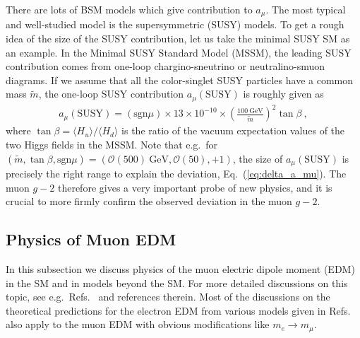 There are lots of BSM models which give contribution
to $a_\mu$.  
The most typical and well-studied model is the
supersymmetric (SUSY) models.  
To get a rough idea of the size of the SUSY contribution,
let us take the minimal SUSY SM as an example. 
In the Minimal SUSY Standard Model (MSSM), the
leading SUSY contribution comes from
one-loop chargino-sneutrino or neutralino-smuon diagrams.  
If we assume that all the color-singlet SUSY particles have a common
mass $\tilde{m}$, the one-loop SUSY contribution
$a_\mu(\text{SUSY})$ is roughly given as~\cite{Czarnecki:2001pv}
%
\begin{align}
 a_\mu(\text{SUSY}) = (\text{sgn} \mu)  \times 13 \times 10^{-10}
\times \left( \frac{100 ~\text{GeV}}{\tilde{m}}\right)^2 \tan\beta~,
\end{align}
%
where $\tan\beta = \langle H_u \rangle/ \langle H_d \rangle$ 
is the ratio of the vacuum expectation values of the two Higgs
fields in the MSSM.  Note that e.g.\ for 
$(\tilde{m}, \tan\beta, \text{sgn}\mu) 
= ({\mathcal O}(500) ~\text{GeV}, {\mathcal O}(50), +1)$,
the size of $a_\mu(\text{SUSY})$ is precisely the right
range to explain the deviation, Eq.~(\ref{eq:delta_a_mu}).  
The muon $g-2$ therefore gives a very important probe
of new physics, and it is crucial to more firmly 
confirm the observed deviation in the muon $g-2$.





\subsection{Physics of Muon EDM}

In this subsection we discuss physics of the muon electric dipole
moment (EDM) in the SM and in models beyond
the SM.  For more detailed discussions on this topic, 
see e.g.\ Refs.~\cite{Barr:1988mc, Bernreuther:1990jx, Pospelov:2005pr, 
Fukuyama:2012np, Fukuyama:2015yya} and references therein. 
Most of the discussions on the theoretical predictions for
the electron EDM from various models given in
Refs.~\cite{Barr:1988mc, Bernreuther:1990jx, Pospelov:2005pr,
Fukuyama:2012np, Fukuyama:2015yya} also apply to the
muon EDM with obvious modifications like $m_e \to m_\mu$. 

%

